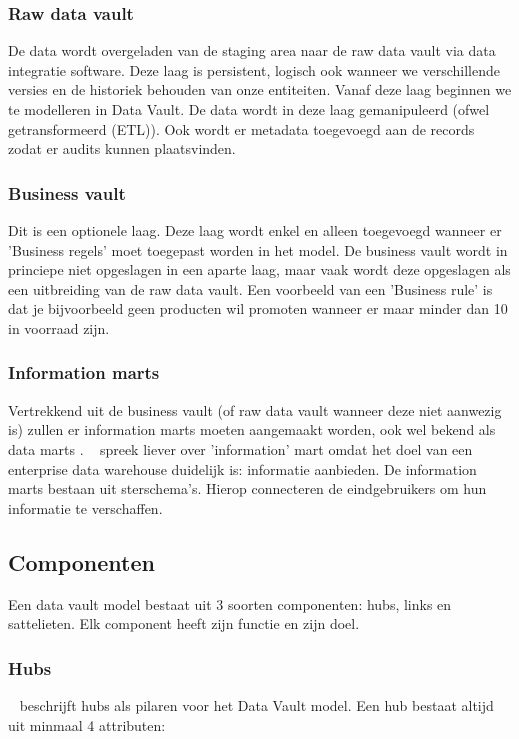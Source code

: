 \subsubsection{Raw data vault}
De data wordt overgeladen van de staging area naar de raw data vault via data integratie software. Deze laag is persistent, logisch ook wanneer we verschillende versies en de historiek behouden van onze entiteiten. Vanaf deze laag beginnen we te modelleren in Data Vault. De data wordt in deze laag gemanipuleerd (ofwel getransformeerd (ETL)). Ook wordt er metadata toegevoegd aan de records zodat er audits kunnen plaatsvinden. 

\subsubsection{Business vault}
Dit is een optionele laag. Deze laag wordt enkel en alleen toegevoegd wanneer er 'Business regels' moet toegepast worden in het model. De business vault wordt in princiepe niet opgeslagen in een aparte laag, maar vaak wordt deze opgeslagen als een uitbreiding van de raw data vault. Een voorbeeld van een 'Business rule' is dat je bijvoorbeeld geen producten wil promoten wanneer er maar minder dan 10 in voorraad zijn.

\subsubsection{Information marts}
Vertrekkend uit de business vault (of raw data vault wanneer deze niet aanwezig is) zullen er information marts moeten aangemaakt worden, ook wel bekend als data marts . ~\textcite{Linstedt2016} spreek liever over 'information' mart omdat het doel van een enterprise data warehouse duidelijk is: informatie aanbieden. 
De information marts bestaan uit sterschema's. Hierop connecteren de eindgebruikers om hun informatie te verschaffen. 

\subsection{Componenten}
Een data vault model bestaat uit 3 soorten componenten: hubs, links en sattelieten. Elk component heeft zijn functie en zijn doel.

\subsubsection{Hubs}
~\textcite{Linstedt2016} beschrijft hubs als pilaren voor het Data Vault model. Een hub bestaat altijd uit minmaal 4 attributen:

